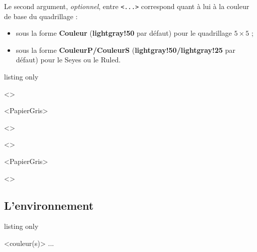 \documentclass[a4paper]{article}
\newcommand\Cle[1]{{\bfseries\sffamily\textlangle #1\textrangle}}
\begin{document}
Le second argument, \textit{optionnel}, entre \texttt{<...>} correspond quant à lui à la couleur de base du quadrillage :

\begin{itemize}
	\item sous la forme \Cle{Couleur} (\Cle{lightgray!50} par défaut) pour le quadrillage $5\times5$ ;
	\item sous la forme \Cle{CouleurP/CouleurS} (\Cle{lightgray!50/lightgray!25} par défaut) pour le Seyes ou le Ruled.
\end{itemize}

\medskip

\begin{PresentationCode}{listing only}

\AffQuadrillage[NbCarreaux=18x4,Grille=Seyes,AffBarre=false]<\CoulSeyes>

\AffQuadrillage[NbCarreaux=36x8,Elargir=3/3]<PapierGris>

\begin{center}
	\AffQuadrillage[NbCarreaux=12x3,Elargir=2/2,Grille=Ruled,Marge=2]<\CoulRuled>
\end{center}
\end{PresentationCode}

\medskip

\AffQuadrillage[NbCarreaux=18x4,Grille=Seyes,AffBarre=false]<\CoulSeyes>

\medskip

\AffQuadrillage[NbCarreaux=36x8,Elargir=3/3]<PapierGris>

\begin{center}
	\AffQuadrillage[NbCarreaux=12x3,Elargir=2/2,Grille=Ruled,Marge=2]<\CoulRuled>
\end{center}

\pagebreak

\subsection{L'environnement}

\begin{PresentationCode}{listing only}

\begin{EnvQuadrillage}[clés]<couleur(s)>
	...
\end{EnvQuadrillage}
\end{PresentationCode}
\end{document}
